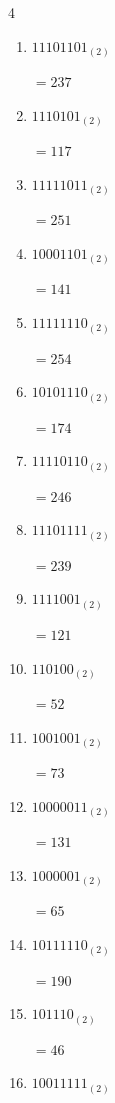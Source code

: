 \begin{multicols}{4}
\begin{enumerate}
        $=237$

  \item $11101101_{(2)}$

        $=237$

  \item $1110101_{(2)}$

        $=117$

  \item $11111011_{(2)}$

        $=251$

\columnbreak %

  \item $10001101_{(2)}$

        $=141$

  \item $11111110_{(2)}$

        $=254$

  \item $10101110_{(2)}$

        $=174$

  \item $11110110_{(2)}$

        $=246$

  \item $11101111_{(2)}$

        $=239$

  \item $1111001_{(2)}$

        $=121$

  \item $110100_{(2)}$

        $=52$

  \item $1001001_{(2)}$

        $=73$

  \item $10000011_{(2)}$

        $=131$

  \item $1000001_{(2)}$

        $=65$

  \item $10111110_{(2)}$

        $=190$

  \item $101110_{(2)}$

        $=46$

  \item $10011111_{(2)}$


\end{enumerate}
\end{multicols}
